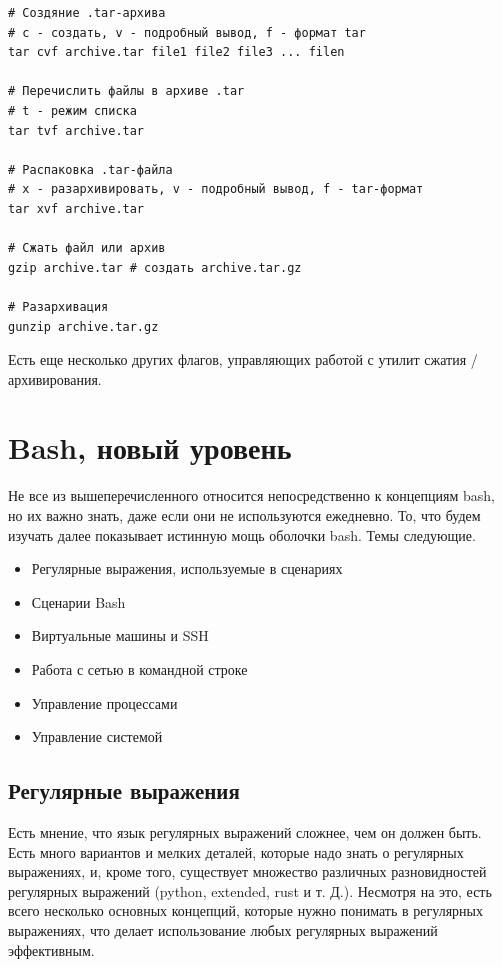 \documentclass[12pt]{article}
\providecommand{\tightlist}{%
  \setlength{\itemsep}{0pt}\setlength{\parskip}{0pt}}
\begin{document}
\begin{verbatim}
# Создяние .tar-архива
# c - создать, v - подробный вывод, f - формат tar
tar cvf archive.tar file1 file2 file3 ... filen

# Перечислить файлы в архиве .tar
# t - режим списка
tar tvf archive.tar

# Распаковка .tar-файла
# x - разархивировать, v - подробный вывод, f - tar-формат
tar xvf archive.tar

# Сжать файл или архив
gzip archive.tar # создать archive.tar.gz

# Разархивация
gunzip archive.tar.gz
\end{verbatim}

Есть еще несколько других флагов, управляющих работой с утилит сжатия /
архивирования.

\hypertarget{Advanced-Bash}{%
\section{\texorpdfstring{\protect\hyperlink{Advanced-Bash}{}Bash, новый
уровень}{Bash, новый уровень}}\label{Advanced-Bash}}

Не все из вышеперечисленного относится непосредственно к концепциям
bash, но их важно знать, даже если они не используются ежедневно. То,
что будем изучать далее показывает истинную мощь оболочки bash. Темы
следующие.

\begin{itemize}
\tightlist
\item
  Регулярные выражения, используемые в сценариях
\item
  Сценарии Bash
\item
  Виртуальные машины и SSH
\item
  Работа с сетью в командной строке
\item
  Управление процессами
\item
  Управление системой
\end{itemize}

\hypertarget{Regular-Expressions}{%
\subsection{\texorpdfstring{\protect\hyperlink{Regular-Expressions}{}Регулярные
выражения}{Регулярные выражения}}\label{Regular-Expressions}}

Есть мнение, что язык регулярных выражений сложнее, чем он должен быть.
Есть много вариантов и мелких деталей, которые надо знать о регулярных
выражениях, и, кроме того, существует множество различных разновидностей
регулярных выражений (python, extended, rust и т. Д.). Несмотря на это,
есть всего несколько основных концепций, которые нужно понимать в
регулярных выражениях, что делает использование любых регулярных
выражений эффективным.
\end{document}
